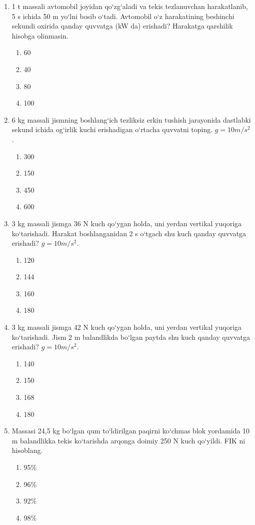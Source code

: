 \begin{enumerate}
\item 1 t massali avtomobil joyidan qo‘zg‘aladi va tekis tezlanuvchan harakatlanib, 5 s ichida 50 m yo‘lni bosib o‘tadi. Avtomobil o‘z harakatining beshinchi sekundi oxirida qanday quvvatga (kW da) erishadi? Harakatga qarshilik hisobga olinmasin.
\begin{enumerate}[label=\Alph*)]
\item 60
\item 40
\item 80
\item 100
\end{enumerate}

\item 6 kg massali jismning boshlang‘ich tezliksiz erkin tushish jarayonida dastlabki sekund ichida og‘irlik kuchi erishadigan o‘rtacha quvvatni toping. $g=10 m/s^2$.
\begin{enumerate}[label=\Alph*)]
\item 300
\item 150
\item 450
\item 600
\end{enumerate}

\item 3 kg massali jismga 36 N kuch qo‘ygan holda, uni yerdan vertikal yuqoriga ko‘tarishadi. Harakat boshlanganidan 2 s o‘tgach shu kuch qanday quvvatga erishadi? $g=10 m/s^2$.
\begin{enumerate}[label=\Alph*)]
\item 120
\item 144
\item 160
\item 180
\end{enumerate}

\item 3 kg massali jismga 42 N kuch qo‘ygan holda, uni yerdan vertikal yuqoriga ko‘tarishadi. Jism 2 m balandlikda bo‘lgan paytda shu kuch qanday quvvatga erishadi? $g=10 m/s^2$.
\begin{enumerate}[label=\Alph*)]
\item 140
\item 150
\item 168
\item 180
\end{enumerate}

\item Massasi 24,5 kg bo‘lgan qum to‘ldirilgan paqirni ko‘chmas blok yordamida 10 m balandlikka tekis ko‘tarishda arqonga doimiy 250 N kuch qo‘yildi. FIK ni hisoblang.
\begin{enumerate}[label=\Alph*)]
\item 95\%
\item 96\%
\item 92\%
\item 98\%
\end{enumerate}


\end{enumerate}

